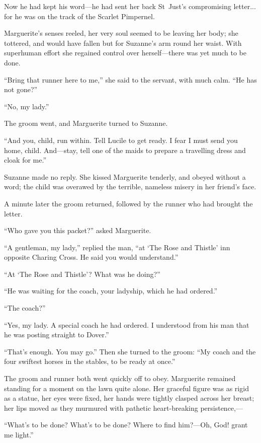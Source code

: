 Now he had kept his word---he had sent her back St~Just's compromising letter... for he was on the track of the Scarlet Pimpernel.

Marguerite's senses reeled, her very soul seemed to be leaving her body; she tottered, and would have fallen but for Suzanne's arm round her waist. With superhuman effort she regained control over herself---there was yet much to be done.

\enquote{Bring that runner here to me,} she said to the servant, with much calm. \enquote{He has not gone?}

\enquote{No, my lady.}

The groom went, and Marguerite turned to Suzanne.

\enquote{And you, child, run within. Tell Lucile to get ready. I fear I must send you home, child. And---stay, tell one of the maids to prepare a travelling dress and cloak for me.}

Suzanne made no reply. She kissed Marguerite tenderly, and obeyed without a word; the child was overawed by the terrible, nameless misery in her friend's face.

A minute later the groom returned, followed by the runner who had brought the letter.

\enquote{Who gave you this packet?} asked Marguerite.

\enquote{A gentleman, my lady,} replied the man, \enquote{at \enquote{The Rose and Thistle} inn opposite Charing Cross. He said you would understand.}

\enquote{At \enquote{The Rose and Thistle}? What was he doing?}

\enquote{He was waiting for the coach, your ladyship, which he had ordered.}

\enquote{The coach?}

\enquote{Yes, my lady. A special coach he had ordered. I understood from his man that he was posting straight to Dover.}

\enquote{That's enough. You may go.} Then she turned to the groom: \enquote{My coach and the four swiftest horses in the stables, to be ready at once.}

The groom and runner both went quickly off to obey. Marguerite remained standing for a moment on the lawn quite alone. Her graceful figure was as rigid as a statue, her eyes were fixed, her hands were tightly clasped across her breast; her lips moved as they murmured with pathetic heart-breaking persistence,---

\enquote{What's to be done? What's to be done? Where to find him?---Oh, God! grant me light.}


